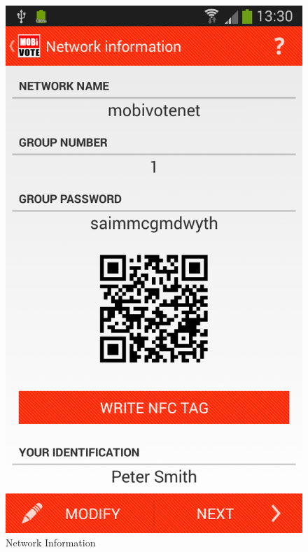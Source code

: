 \documentclass[numbers=noenddot, abstract=on, a4paper, headsepline,
footsepline, oneside, draft=off]{scrreprt}
\begin{document}
\begin{figure}[!htb]
	\begin{minipage}{.5\textwidth}
  		\centering
		\includegraphics[height=.4\textheight]{img/screenshots/network_information}
		\caption{Network Information}
		\label{fig:handbook_networkinformation}
		\end{minipage}
	\begin{minipage}{.5\textwidth}
  		\centering

\end{minipage}
\end{figure}
\end{document}
